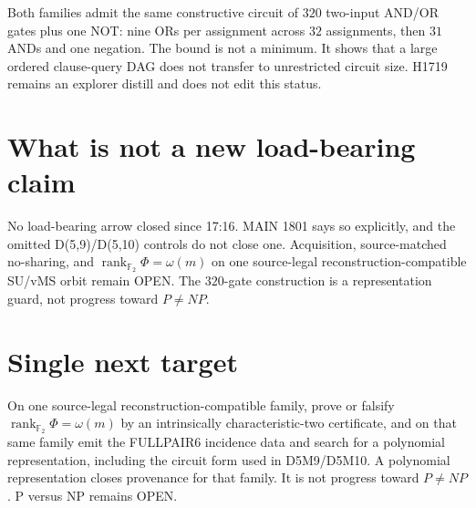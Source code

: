 \documentclass[11pt]{article}
\begin{document}
Both families admit the same constructive circuit of \(320\) two-input AND/OR gates plus
one NOT: nine ORs per assignment across \(32\) assignments, then \(31\) ANDs and one
negation. The bound is not a minimum. It shows that a large ordered clause-query DAG
does not transfer to unrestricted circuit size. H1719 remains an explorer distill and
does not edit this status.

\section*{What is not a new load-bearing claim}
No load-bearing arrow closed since 17:16. MAIN 1801 says so explicitly, and the omitted
D(5,9)/D(5,10) controls do not close one. Acquisition, source-matched no-sharing, and
\(\operatorname{rank}_{\mathbb F_2}\Phi=\omega(m)\)
on one source-legal reconstruction-compatible SU/vMS orbit remain OPEN.
The \(320\)-gate construction is a representation guard, not progress toward \(P\neq NP\).

\section*{Single next target}
On one source-legal reconstruction-compatible family, prove or falsify
\(\operatorname{rank}_{\mathbb F_2}\Phi=\omega(m)\) by an intrinsically
characteristic-two certificate, and on that same family emit the FULLPAIR6 incidence
data and search for a polynomial representation, including the circuit form used in
D5M9/D5M10. A polynomial representation closes provenance for that family. It is not
progress toward \(P\neq NP\).
P versus NP remains OPEN.

\end{document}
